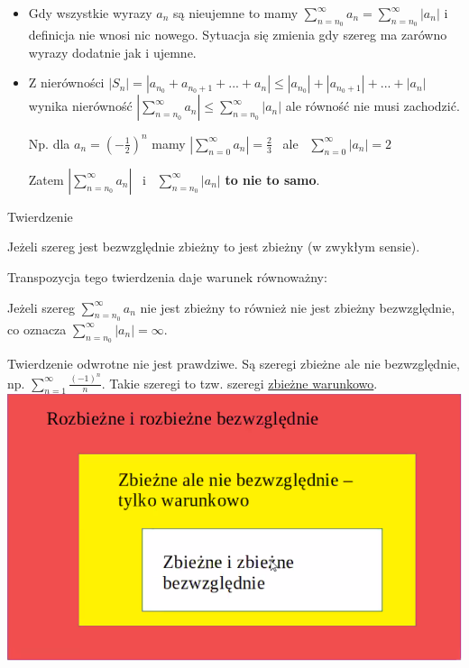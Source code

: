 \begin{itemize}
    \item Gdy wszystkie wyrazy $a_n$ są nieujemne to mamy $\sum\limits_{n=n_0}^{\infty} a_n = \sum\limits_{n=n_0}^{\infty} |a_n|$
    i definicja nie wnosi nic nowego. Sytuacja się zmienia gdy szereg ma zarówno wyrazy dodatnie jak i ujemne.
    \item Z nierówności $|S_n|= |a_{n_0} + a_{n_0+1} + ... + a_n| \leq |a_{n_0}| + |a_{n_0 + 1}| + ... + |a_n| $
    wynika nierówność $ \left| \sum\limits_{n=n_0}^{\infty} a_n \right| \leq \sum\limits_{n=n_0}^{\infty} |a_n| $
    ale równość nie musi zachodzić.

    Np. dla $ a_n = \left( -\frac{1}{2} \right)^n $ mamy $ \left| \sum\limits_{n=0}^{\infty} a_n \right| = \frac{2}{3} $
    \ ale \ $  \sum\limits_{n=0}^{\infty} |a_n| = 2 $

    Zatem $ \left| \sum\limits_{n=n_0}^{\infty} a_n \right| $ \ i \ $ \sum\limits_{n=n_0}^{\infty} |a_n| $ \textbf{to nie to samo}. \\
\end{itemize}

\begin{tw}{Twierdzenie}

Jeżeli szereg jest bezwzględnie zbieżny to jest zbieżny (w zwykłym sensie).

Transpozycja tego twierdzenia daje warunek równoważny:

Jeżeli szereg $ \sum\limits_{n = n_0}^{\infty} a_n $ nie jest zbieżny to również nie jest zbieżny bezwzględnie, co oznacza
$ \sum\limits_{n=n_0}^{\infty} |a_n| = \infty $.
\end{tw}

Twierdzenie odwrotne nie jest prawdziwe. Są szeregi zbieżne ale nie bezwzględnie, np.
$ \sum\limits_{n=1}^{\infty} \frac{(-1)^n}{n} $. Takie szeregi to tzw. szeregi \underline{zbieżne warunkowo}. \\

\includegraphics[scale=0.6]{img/rozbiezneirozbiezne.png} \\

